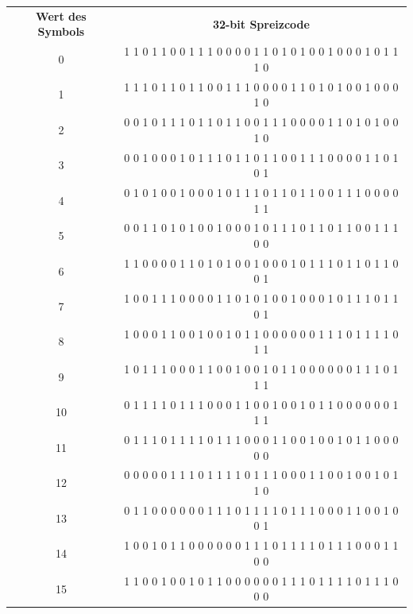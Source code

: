 \begin{center}
	\begin{tabular}{cc}
		\textbf{Wert des Symbols} & \textbf{32-bit Spreizcode} \\
		0 &1 1 0 1 1 0 0 1 1 1 0 0 0 0 1 1 0 1 0 1 0 0 1 0 0 0 1 0 1 1 1 0\\
		1&1 1 1 0 1 1 0 1 1 0 0 1 1 1 0 0 0 0 1 1 0 1 0 1 0 0 1 0 0 0 1 0\\
		2&0 0 1 0 1 1 1 0 1 1 0 1 1 0 0 1 1 1 0 0 0 0 1 1 0 1 0 1 0 0 1 0\\
		3&0 0 1 0 0 0 1 0 1 1 1 0 1 1 0 1 1 0 0 1 1 1 0 0 0 0 1 1 0 1 0 1\\
		4&0 1 0 1 0 0 1 0 0 0 1 0 1 1 1 0 1 1 0 1 1 0 0 1 1 1 0 0 0 0 1 1\\
		5&0 0 1 1 0 1 0 1 0 0 1 0 0 0 1 0 1 1 1 0 1 1 0 1 1 0 0 1 1 1 0 0\\
		6&1 1 0 0 0 0 1 1 0 1 0 1 0 0 1 0 0 0 1 0 1 1 1 0 1 1 0 1 1 0 0 1\\
		7&1 0 0 1 1 1 0 0 0 0 1 1 0 1 0 1 0 0 1 0 0 0 1 0 1 1 1 0 1 1 0 1\\
		8&1 0 0 0 1 1 0 0 1 0 0 1 0 1 1 0 0 0 0 0 0 1 1 1 0 1 1 1 1 0 1 1\\
		9&1 0 1 1 1 0 0 0 1 1 0 0 1 0 0 1 0 1 1 0 0 0 0 0 0 1 1 1 0 1 1 1\\
		10&0 1 1 1 1 0 1 1 1 0 0 0 1 1 0 0 1 0 0 1 0 1 1 0 0 0 0 0 0 1 1 1\\11&0 1 1 1 0 1 1 1 1 0 1 1 1 0 0 0 1 1 0 0 1 0 0 1 0 1 1 0 0 0 0 0\\
		12&0 0 0 0 0 1 1 1 0 1 1 1 1 0 1 1 1 0 0 0 1 1 0 0 1 0 0 1 0 1 1 0\\
		13&0 1 1 0 0 0 0 0 0 1 1 1 0 1 1 1 1 0 1 1 1 0 0 0 1 1 0 0 1 0 0 1\\
		14&1 0 0 1 0 1 1 0 0 0 0 0 0 1 1 1 0 1 1 1 1 0 1 1 1 0 0 0 1 1 0 0\\
		15&1 1 0 0 1 0 0 1 0 1 1 0 0 0 0 0 0 1 1 1 0 1 1 1 1 0 1 1 1 0 0 0\\
	\end{tabular}
\end{center}

